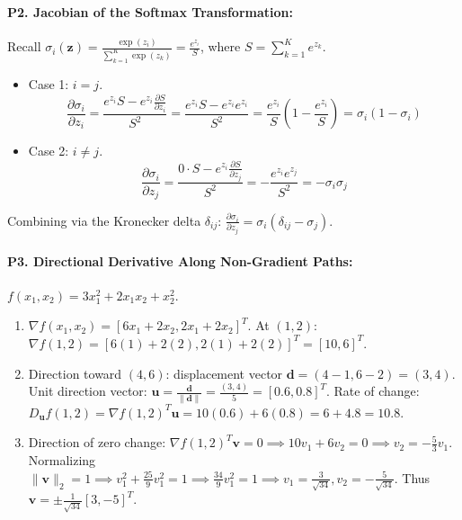 \paragraph{P2. Jacobian of the Softmax Transformation:}
Recall $\sigma_i(\mathbf{z}) = \frac{\exp(z_i)}{\sum_{k=1}^K \exp(z_k)} = \frac{e^{z_i}}{S}$, where $S = \sum_{k=1}^K e^{z_k}$.
\begin{itemize}
    \item Case 1: $i = j$.
    \begin{equation*}
    \frac{\partial \sigma_i}{\partial z_i} = \frac{e^{z_i} S - e^{z_i} \frac{\partial S}{\partial z_i}}{S^2} = \frac{e^{z_i} S - e^{z_i} e^{z_i}}{S^2} = \frac{e^{z_i}}{S} \left( 1 - \frac{e^{z_i}}{S} \right) = \sigma_i (1 - \sigma_i)
    \end{equation*}
    \item Case 2: $i \ne j$.
    \begin{equation*}
    \frac{\partial \sigma_i}{\partial z_j} = \frac{0 \cdot S - e^{z_i} \frac{\partial S}{\partial z_j}}{S^2} = -\frac{e^{z_i} e^{z_j}}{S^2} = -\sigma_i \sigma_j
    \end{equation*}
\end{itemize}
Combining via the Kronecker delta $\delta_{ij}$: $\frac{\partial \sigma_i}{\partial z_j} = \sigma_i (\delta_{ij} - \sigma_j)$.

\paragraph{P3. Directional Derivative Along Non-Gradient Paths:}
$f(x_1, x_2) = 3x_1^2 + 2x_1 x_2 + x_2^2$.
\begin{enumerate}[label=(\alph*)]
    \item $\nabla f(x_1, x_2) = [6x_1 + 2x_2, 2x_1 + 2x_2]^T$.
    At $(1, 2)$: $\nabla f(1, 2) = [6(1) + 2(2), 2(1) + 2(2)]^T = [10, 6]^T$.
    \item Direction toward $(4, 6)$: displacement vector $\mathbf{d} = (4 - 1, 6 - 2) = (3, 4)$.
    Unit direction vector: $\mathbf{u} = \frac{\mathbf{d}}{\|\mathbf{d}\|} = \frac{(3, 4)}{5} = [0.6, 0.8]^T$.
    Rate of change: $D_{\mathbf{u}} f(1, 2) = \nabla f(1, 2)^T \mathbf{u} = 10(0.6) + 6(0.8) = 6 + 4.8 = 10.8$.
    \item Direction of zero change: $\nabla f(1, 2)^T \mathbf{v} = 0 \implies 10 v_1 + 6 v_2 = 0 \implies v_2 = -\frac{5}{3}v_1$.
    Normalizing $\|\mathbf{v}\|_2 = 1 \implies v_1^2 + \frac{25}{9}v_1^2 = 1 \implies \frac{34}{9}v_1^2 = 1 \implies v_1 = \frac{3}{\sqrt{34}}, v_2 = -\frac{5}{\sqrt{34}}$.
    Thus $\mathbf{v} = \pm \frac{1}{\sqrt{34}}[3, -5]^T$.
\end{enumerate}

